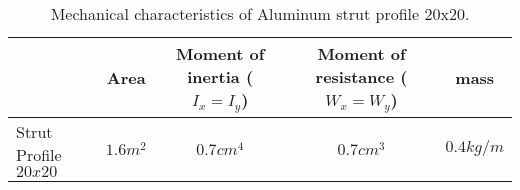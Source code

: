 \begin{table}[]
\centering
\caption{Mechanical characteristics of Aluminum strut profile 20x20.}
\label{strut-profile}
\begin{tabular}{l|c|c|c|c|}
\cline{2-5}
 & Area & Moment of inertia ($I_x = I_y$) & Moment of resistance ($W_x=W_y$) & mass \\ \hline
\multicolumn{1}{|l|}{Strut Profile $20x20$} & $1.6m^2$ & $0.7cm^4$ & $0.7cm^3$ & $0.4kg/m$ \\ \hline
\end{tabular}
\end{table}